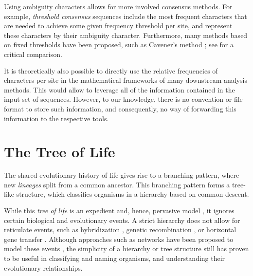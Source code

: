 Using ambiguity characters allows for more involved consensus methods.
For example, \emph{threshold consensus} sequences \citep{Day1992a,Day1992} include the most frequent characters
that are needed to achieve some given frequency threshold per site,
and represent these characters by their ambiguity character.
Furthermore, many methods based on fixed thresholds have been proposed,
such as Cavener's method \citep{Cavener1987,Cavener1991a};
see \cite{Day1992a} for a critical comparison.

It is theoretically also possible to directly use the relative frequencies of characters per site
in the mathematical frameworks of many downstream analysis methods.
This would allow to leverage all of the information contained in the input set of sequences.
However, to our knowledge, there is no convention or file format to store such information,
and consequently, no way of forwarding this information to the respective tools.


\section{The Tree of Life}
\label{ch:Foundations:sec:TreeOfLife}

The shared evolutionary history of life gives rise to a branching pattern,
where new \emph{lineages} split from a common ancestor.
This branching pattern forms a tree-like structure,
which classifies organisms in a hierarchy based on common descent.

While this \emph{tree of life} is an expedient and, hence, pervasive model \cite{Mindell2013},
it ignores certain biological and evolutionary events.
A strict hierarchy does not allow for reticulate events,
such as hybridization \cite{Maddison1997a}, genetic recombination \cite{Hein1993},
or horizontal gene transfer \cite{Ochman2000,DunningHotopp2011,Robinson2013}.
Although approaches such as networks have been proposed to model these events \cite{Huson2011a},
the simplicity of a hierarchy or tree structure still has proven
to be useful in classifying and naming organisms, and understanding their evolutionary relationships.


